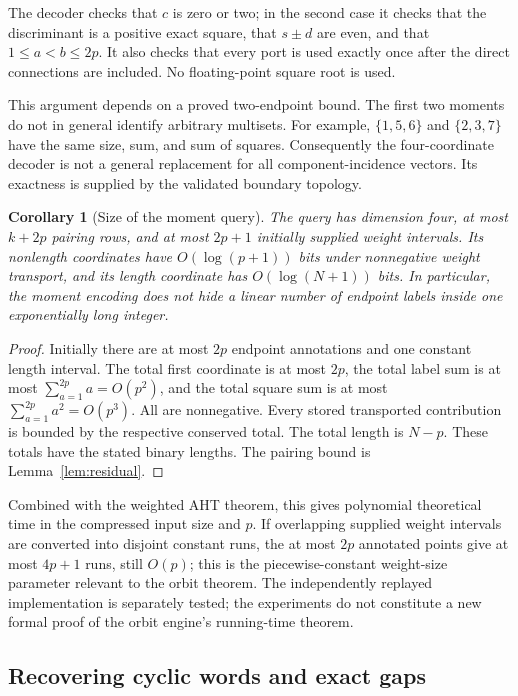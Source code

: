 \documentclass[11pt,letterpaper]{article}
\newtheorem{corollary}[theorem]{Corollary}
\theoremstyle{definition}
\theoremstyle{remark}
\begin{document}
The decoder checks that $c$ is zero or two; in the second case it checks
that the discriminant is a positive exact square, that $s\pm d$ are even,
and that $1\le a<b\le2p$. It also checks that every port is used exactly
once after the direct connections are included. No floating-point square
root is used.

This argument depends on a proved two-endpoint bound. The first two moments
do not in general identify arbitrary multisets. For example,
$\{1,5,6\}$ and $\{2,3,7\}$ have the same size, sum, and sum of squares.
Consequently the four-coordinate decoder is not a general replacement for
all component-incidence vectors. Its exactness is supplied by the
validated boundary topology.

\begin{corollary}[Size of the moment query]
\label{cor:moment-size}
The query has dimension four, at most $k+2p$ pairing rows, and at most
$2p+1$ initially supplied weight intervals. Its nonlength coordinates have
$O(\log(p+1))$ bits under nonnegative weight transport, and its length
coordinate has $O(\log(N+1))$ bits. In particular, the moment encoding does
not hide a linear number of endpoint labels inside one exponentially long
integer.
\end{corollary}
\begin{proof}
Initially there are at most $2p$ endpoint annotations and one constant
length interval. The total first coordinate is at most $2p$, the total
label sum is at most $\sum_{a=1}^{2p}a=O(p^2)$, and the total square sum is
at most $\sum_{a=1}^{2p}a^2=O(p^3)$. All are nonnegative. Every stored
transported contribution is bounded by the respective conserved total.
The total length is $N-p$. These totals have the stated binary lengths.
The pairing bound is Lemma~\ref{lem:residual}.
\end{proof}

Combined with the weighted AHT theorem, this gives polynomial theoretical
time in the compressed input size and $p$. If overlapping supplied weight
intervals are converted into disjoint constant runs, the at most $2p$
annotated points give at most $4p+1$ runs, still $O(p)$; this is the
piecewise-constant weight-size parameter relevant to the orbit theorem.
The independently replayed
implementation is separately tested; the experiments do not constitute a
new formal proof of the orbit engine's running-time theorem.

\subsection{Recovering cyclic words and exact gaps}
\end{document}
